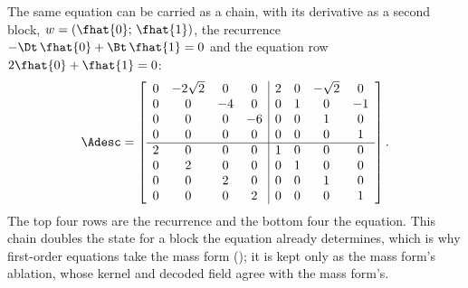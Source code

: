 The same equation can be carried as a chain, with its derivative as a second block, $w = (\fhat{0};\, \fhat{1})$, the recurrence $-\Dt\,\fhat{0} + \Bt\,\fhat{1} = 0$ and the equation row $2\fhat{0} + \fhat{1} = 0$:
\begin{equation}
    \Adesc =
    \left[
    \begin{array}{cccc|cccc}
        0 & -2\sqrt{2} & 0 & 0 & 2 & 0 & -\sqrt{2} & 0 \\
        0 & 0 & -4 & 0 & 0 & 1 & 0 & -1 \\
        0 & 0 & 0 & -6 & 0 & 0 & 1 & 0 \\
        0 & 0 & 0 & 0 & 0 & 0 & 0 & 1 \\ \hline
        2 & 0 & 0 & 0 & 1 & 0 & 0 & 0 \\
        0 & 2 & 0 & 0 & 0 & 1 & 0 & 0 \\
        0 & 0 & 2 & 0 & 0 & 0 & 1 & 0 \\
        0 & 0 & 0 & 2 & 0 & 0 & 0 & 1
    \end{array}
    \right] .
    \label{eq:app-descriptor-8x8}
\end{equation}
The top four rows are the recurrence and the bottom four the equation. This chain doubles the state for a block the equation already determines, which is why first-order equations take the mass form (); it is kept only as the mass form's ablation, whose kernel and decoded field agree with the mass form's.
